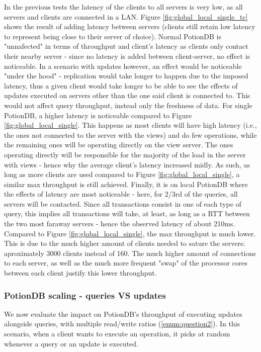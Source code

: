 \documentclass{vldb}
\begin{document}
In the previous tests the latency of the clients to all servers is very low, as all servers and clients are connected in a LAN.
Figure \ref{fig:global_local_single_tc} shows the result of adding latency between servers (clients still retain low latency to represent being close to their server of choice).
Normal PotionDB is "unnafected" in terms of throughput and client's latency as clients only contact their nearby server - since no latency is added between client-server, no effect is noticeable.
In a scenario with updates however, an effect would be noticeable "under the hood" - replication would take longer to happen due to the imposed latency, thus a given client would take longer to be able to see the effects of updates executed on servers other than the one said client is connected to.
This would not affect query throughput, instead only the freshness of data.
For single PotionDB, a higher latency is noticeable compared to Figure \ref{fig:global_local_single}.
This happens as most clients will have high latency (i.e., the ones not connected to the server with the views) and do few operations, while the remaining ones will be operating directly on the view server.
The ones operating directly will be responsible for the majority of the load in the server with views - hence why the average client's latency increased midly.
As such, as long as more clients are used compared to Figure \ref{fig:global_local_single}, a similar max throughput is still achieved.
Finally, it is on local PotionDB where the effects of latency are most noticeable - here, for 2/3rd of the queries, all servers will be contacted. Since all transactions consist in one of each type of query, this implies all transactions will take, at least, as long as a RTT between the two most faraway servers - hence the observed latency of about 210ms.
Compared to Figure \ref{fig:global_local_single}, the max throughput is much lower. This is due to the much higher amount of clients needed to sature the servers: aproximately 3000 clients instead of 160.
The much higher amount of connections to each server, as well as the much more frequent "swap" of the processor cores between each client justify this lower throughput.

\subsubsection{PotionDB scaling - queries VS updates}

We now evaluate the impact on PotionDB's throughput of executing updates alongside queries, with multiple read/write ratios (\ref{enum:question2}).
In this scenario, when a client wants to execute an operation, it picks at random whenever a query or an update is executed.
\end{document}
